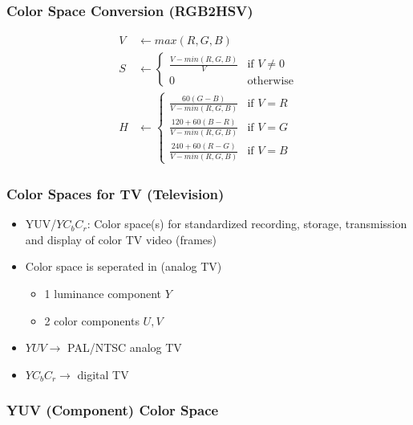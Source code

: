 \documentclass{scrartcl}
\begin{document}
\subsubsection{Color Space Conversion (RGB2HSV)}

\begin{align*}
	V &\leftarrow max(R,G,B) \\
	S &\leftarrow \begin{cases}
		\frac{V-min(R,G,B)}{V} & \text{if } V \neq 0 \\
		0 & \text{otherwise}
	\end{cases} \\
	H & \leftarrow \begin{cases}
		\frac{60(G-B)}{V-min(R,G,B)} & \text{if } V=R \\
		\frac{120+60(B-R)}{V-min(R,G,B)} & \text{if } V=G \\
		\frac{240+60(R-G)}{V-min(R,G,B)} & \text{if } V=B
	\end{cases}
\end{align*}

\subsubsection{Color Spaces for TV (Television)}

\begin{itemize}
	\item YUV/$ YC_bC_r $: Color space(s) for standardized recording, storage, transmission and display of color TV video (frames)
	\item Color space is seperated in (analog TV)
	\begin{itemize}
		\item 1 luminance component $ Y $
		\item 2 color components $ U,V $
	\end{itemize}
	\item $ YUV \rightarrow $ PAL/NTSC analog TV
	\item $ YC_bC_r \rightarrow $ digital TV
\end{itemize}

\subsubsection{YUV (Component) Color Space}
\end{document}
